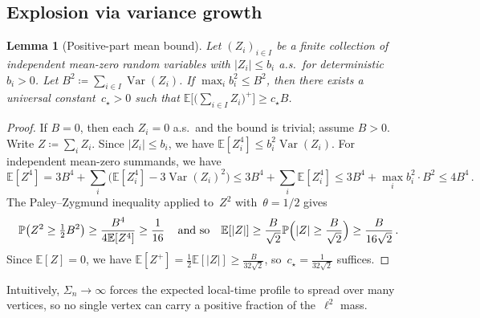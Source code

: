 \documentclass[aop]{imsart}
\theoremstyle{plain}
\newtheorem{lemma}[theorem]{Lemma}
\theoremstyle{definition}
\newcommand{\E}{\mathbb{E}}
\renewcommand{\P}{\mathbb{P}}
\DeclareMathOperator{\var}{Var}
\begin{document}
	\subsection{Explosion via variance growth}
	
	\begin{lemma}[Positive-part mean bound]\label{lem:positive-part}
		Let $(Z_i)_{i\in I}$ be a finite collection of independent mean-zero random variables
		with $|Z_i|\leq b_i$ a.s.\ for deterministic $b_i>0$.
		Let $B^2\coloneqq\sum_{i\in I}\var(Z_i)$.
		If $\max_{i}b_i^2\leq B^2$, then there exists a universal constant~$c_\star>0$ such that $\E\bigl[\bigl(\sum_{i\in I}Z_i\bigr)^{\!+}\bigr]\geq c_\star B$.
	\end{lemma}
	\begin{proof}
		If $B=0$, then each $Z_i=0$ a.s.\ and the bound is trivial; assume $B>0$.
		Write $Z\coloneqq\sum_i Z_i$.
		Since $|Z_i|\leq b_i$, we have $\E[Z_i^4]\leq b_i^2\var(Z_i)$.
		For independent mean-zero summands, we have
		\[
		\E[Z^4]=3B^4+\sum_i\bigl(\E[Z_i^4]-3\var(Z_i)^2\bigr)\leq 3B^4+\sum_i\E[Z_i^4]\leq 3B^4+\max_i b_i^2\cdot B^2\leq 4B^4\,.
		\]
		The Paley--Zygmund inequality applied to~$Z^2$ with~$\theta=1/2$ gives
		\[
		\P\bigl(Z^2\geq\tfrac{1}{2}B^2\bigr)
		\geq\frac{B^4}{4\E[Z^4]}
		\geq\frac{1}{16}\,
		\quad 
		\text{and so} 
		\quad 
		\E[|Z|]\geq\frac{B}{\sqrt{2}}\P\Bigl(|Z|\geq\frac{B}{\sqrt{2}}\Bigr)\geq\frac{B}{16\sqrt{2}}\,.
		\]
		Since $\E[Z]=0$, we have $\E[Z^+]=\tfrac{1}{2}\E[|Z|]\geq\frac{B}{32\sqrt{2}}$, so~$c_\star=\frac{1}{32\sqrt{2}}$ suffices.
	\end{proof}
	
	Intuitively, $\Sigma_n\to\infty$ forces the expected local-time profile to spread over many vertices, so no single vertex can carry a positive fraction of the~$\ell^2$ mass.
	
\end{document}
